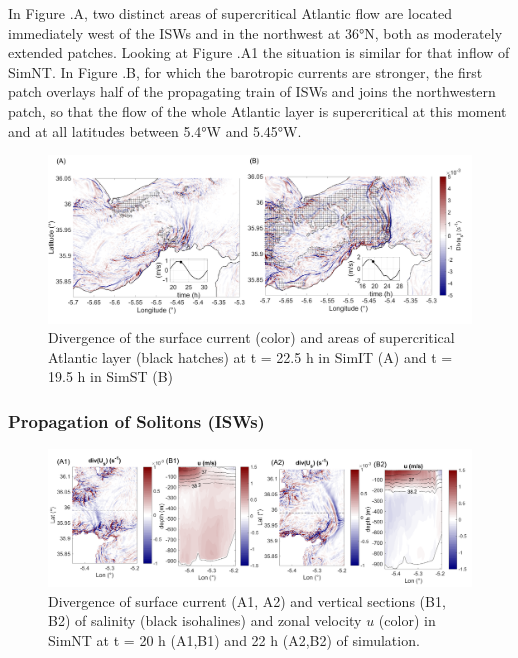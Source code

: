 In Figure .A, two distinct areas of supercritical Atlantic flow are located immediately west of the ISWs and in the northwest at 36°N, both as moderately extended patches. Looking at Figure .A1 the situation is similar for that inflow of SimNT. In Figure .B, for which the barotropic currents are stronger, the first patch overlays half of the propagating train of ISWs and joins the northwestern patch, so that the flow of the whole Atlantic layer is supercritical at this moment and at all latitudes between 5.4°W and 5.45°W.

\begin{figure}[!h]
 \centering
\includegraphics[width=\linewidth]{./GBR3D/FigWaveCont_corrC1.png}
 \caption [Divergence of the surface current and areas of supercritical Atlantic layer]{Divergence of the surface current (color) and areas of supercritical Atlantic layer (black hatches) at t = 22.5 h in SimIT (A) and t = 19.5 h in SimST (B)}
 \label{FigISWGBR3D}
\end{figure}

\subsubsection{Propagation of Solitons (ISWs)}
\label{section_sim3D_ISW}

\begin{figure}[!h]
 \centering
 \includegraphics[width=1.\textwidth]{./GBR3D/coupesISW_ME2-2.png}
 \caption [Divergence of surface current and vertical sections of salinity and zonal velocity.]{Divergence of surface current (A1, A2) and vertical sections (B1, B2) of salinity (black isohalines) and zonal velocity $u$ (color) in SimNT at t = 20 h (A1,B1) and 22 h (A2,B2) of simulation.}
  \label{FigISWNT}
\end{figure}

